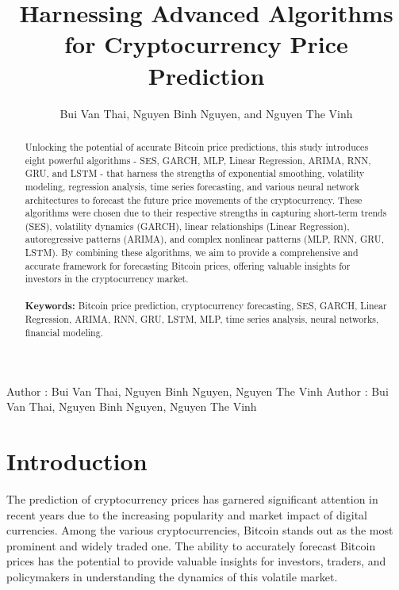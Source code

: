 \documentclass{ieeeojies}
\begin{document}
\title{\Large{Harnessing Advanced Algorithms for Cryptocurrency Price Prediction}}
\vspace{-10mm}
\author{{Bui Van Thai},
  {Nguyen Binh Nguyen, and Nguyen The Vinh}}
\address[1]{21522577, Faculty of Information Systems, University of Information Technology, (e-mail: 21522577@gm.uit.edu.vn)}
\address[2]{21522391, Faculty of Information Systems, University of Information Technology, (e-mail: 21522391@gm.uit.edu.vn)}
\address[3]{21522794, Faculty of Information Systems, University of Information Technology, (e-mail: 21522794@gm.uit.edu.vn)}
\markboth
{Author \headeretal: Bui Van Thai, Nguyen Binh Nguyen, Nguyen The Vinh}
{Author \headeretal: Bui Van Thai, Nguyen Binh Nguyen, Nguyen The Vinh}
\begin{abstract} \par
  Unlocking the potential of accurate Bitcoin price predictions, this study introduces eight powerful algorithms - SES, GARCH, MLP,
  Linear Regression, ARIMA, RNN, GRU, and LSTM - that harness the strengths of exponential smoothing, volatility modeling, regression
  analysis, time series forecasting, and various neural network architectures to forecast the future price movements of the cryptocurrency.
  These algorithms were chosen due to their respective strengths in capturing short-term trends (SES), volatility dynamics (GARCH),
  linear relationships (Linear Regression), autoregressive patterns (ARIMA), and complex nonlinear patterns (MLP, RNN, GRU, LSTM).
  By combining these algorithms, we aim to provide a comprehensive and accurate framework for forecasting Bitcoin prices, offering valuable
  insights for investors in the cryptocurrency market.\\
  \\
  \textbf{Keywords:} Bitcoin price prediction, cryptocurrency forecasting, SES, GARCH, Linear Regression, ARIMA, RNN, GRU, LSTM, MLP, time series analysis, neural networks, financial modeling.
\end{abstract}
\titlepgskip=-40pt
\maketitle
\section{Introduction}
The prediction of cryptocurrency prices has garnered significant attention in recent years due to the increasing popularity and market
impact of digital currencies. Among the various cryptocurrencies, Bitcoin stands out as the most prominent and widely traded one.
The ability to accurately forecast Bitcoin prices has the potential to provide valuable insights for investors, traders, and policymakers
in understanding the dynamics of this volatile market.
\end{document}
